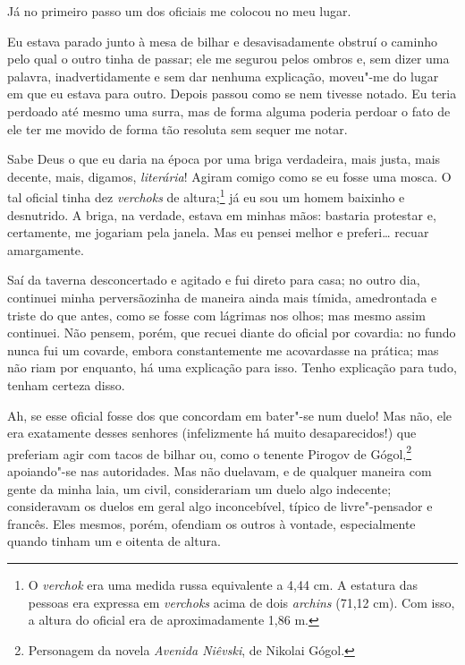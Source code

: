 Já no primeiro passo um dos oficiais me colocou no meu lugar.

Eu estava parado junto à mesa de bilhar e desavisadamente obstruí o
caminho pelo qual o outro tinha de passar; ele me segurou pelos ombros
e, sem dizer uma palavra, inadvertidamente e sem dar nenhuma
explicação, moveu"-me do lugar em que eu estava para outro. Depois
passou como se nem tivesse notado. Eu teria perdoado até mesmo uma
surra, mas de forma alguma poderia perdoar o fato de ele ter me movido
de forma tão resoluta sem sequer me notar.

Sabe Deus o que eu daria na época por uma briga verdadeira, mais justa,
mais decente, mais, digamos, \textit{literária}! Agiram comigo como se
eu fosse uma mosca. O tal oficial tinha dez \textit{verchoks} de
altura;\footnote{ O \textit{verchok} era uma medida russa equivalente a
4,44 cm. A estatura das pessoas era expressa em \textit{verchoks} acima
de dois \textit{archins} (71,12 cm). Com isso, a altura do oficial era
de aproximadamente 1,86 m.} já eu sou um homem baixinho e desnutrido. A
briga, na verdade, estava em minhas mãos: bastaria protestar e,
certamente, me jogariam pela janela. Mas eu pensei melhor e preferi\ldots{}
recuar amargamente.

Saí da taverna desconcertado e agitado e fui direto para casa; no outro
dia, continuei minha perversãozinha de maneira ainda mais tímida,
amedrontada e triste do que antes, como se fosse com lágrimas nos
olhos; mas mesmo assim continuei. Não pensem, porém, que recuei diante
do oficial por covardia: no fundo nunca fui um covarde, embora
constantemente me acovardasse na prática; mas não riam por enquanto, há
uma explicação para isso. Tenho explicação para tudo, tenham certeza
disso.

Ah, se esse oficial fosse dos que concordam em bater"-se num duelo! Mas
não, ele era exatamente desses senhores (infelizmente há muito
desaparecidos!) que preferiam agir com tacos de bilhar ou, como o
tenente Pirogov de Gógol,\footnote{ Personagem da novela \textit{Avenida
Niêvski}, de Nikolai Gógol.} apoiando"-se nas autoridades. Mas não
duelavam, e de qualquer maneira com gente da minha laia, um civil,
considerariam um duelo algo indecente; consideravam os duelos em geral
algo inconcebível, típico de livre"-pensador e francês. Eles mesmos,
porém, ofendiam os outros à vontade, especialmente quando tinham um e
oitenta de altura.

